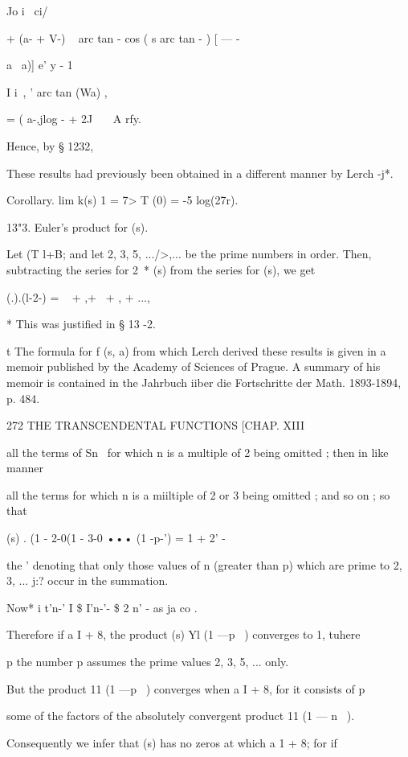 Jo i \ ci/ 

+ (a- + V-) ~   arc tan - cos ( s arc tan - ) [  — - 

    a \ a)] e' y - 1 

I i\ ,    '  arc tan (Wa) , 

= ( a-,jlog -  + 2J  \ \ \ A rfy. 

Hence, by § 1232, 

These results had previously been obtained in a different manner by 
Lerch -j*. 

Corollary. lim k(s)  1 = 7> T (0) = -5 log(27r). 

13"3. Euler's product for  (s). 

Let (T l+B; and let 2, 3, 5, .../>,... be the prime numbers in order. 
Then, subtracting the series for 2~*   (s) from the series for  (s), we get 

 (.).(l-2-) = ~ +  ,+~ +  , + ..., 

* This was justified in § 13 -2. 

t The formula for f (s, a) from which Lerch derived these results is given in a memoir 
published by the Academy of Sciences of Prague. A summary of his memoir is contained in 
the Jahrbuch iiber die Fortschritte der Math. 1893-1894, p. 484. 



272 THE TRANSCENDENTAL FUNCTIONS [CHAP. XIII 

all the terms of Sn~  for which n is a multiple of 2 being omitted ; then in 
like manner 

all the terms for which n is a miiltiple of 2 or 3 being omitted ; and so on ; 
so that 

 (s) . (1 - 2-0(1 - 3-0 ••• (1 -p-') = 1 + 2' -  

the ' denoting that only those values of n (greater than p) which are prime 
to 2, 3, ... j:? occur in the summation. 

Now* i t'n-' I \$ I'n-'-  \$ 2 n' -  as ja   co . 

Therefore if a   I + 8, the product  (s) Yl (1 —p~ ) converges to 1, tuhere 

p 
the number p assumes the prime values 2, 3, 5, ... only. 

But the product 11 (1 —p~ ) converges when a   I + 8, for it consists of 
p 

some of the factors of the absolutely convergent product 11 (1 — n~ ). 

Consequently we infer that  (s) has no zeros at which a  1 + 8; for if 

